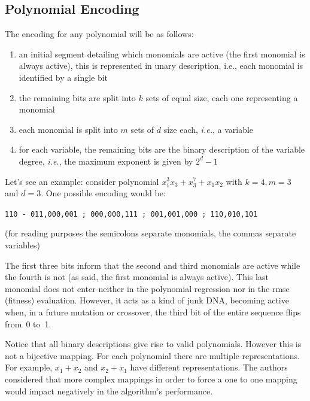 \documentclass[preprint,authoryear,12pt]{elsarticle}
\begin{document}
\subsection{Polynomial Encoding}\label{subs:polynomial.encoding}
%
The encoding for any polynomial will be as follows:
\begin{enumerate}
\item an initial segment detailing which monomials are active (the first monomial is always active), this is represented in unary description, i.e., each monomial is identified by a single bit
\item the remaining bits are split into $k$ sets of equal size, each one representing a monomial
\item each monomial is split into $m$ sets of $d$ size each, \emph{i.e.}, a variable
\item for each variable, the remaining bits are the binary description of the variable degree, \emph{i.e.}, the maximum exponent is given by $2^d-1$
\end{enumerate}

Let's see an example: consider polynomial $x_1^3 x_3 + x_3^7 + x_1 x_2$ with $k = 4, m = 3$ and $d=3$. One possible encoding would be:
\begin{center}
\texttt{110 - 011,000,001 ; 000,000,111 ; 001,001,000 ; 110,010,101}
\end{center}

(for reading purposes the semicolons separate monomials, the commas separate variables)

The first three bits inform that the second and third monomials are active while the fourth is not (as said, the first monomial is always active). This last monomial does not enter neither in the polynomial regression nor in the \ac{rmse} (fitness) evaluation. However, it acts as a kind of junk DNA, becoming active when, in a future mutation or crossover, the third bit of the entire sequence flips from~0 to~1.


Notice that all binary descriptions give rise to valid polynomials. However this is not a bijective mapping. For each polynomial there are multiple representations. For example, $x_1+x_2$ and $x_2+x_1$ have different representations. The authors considered that more complex mappings in order to force a one to one mapping would impact negatively in the algorithm's performance.
\end{document}
